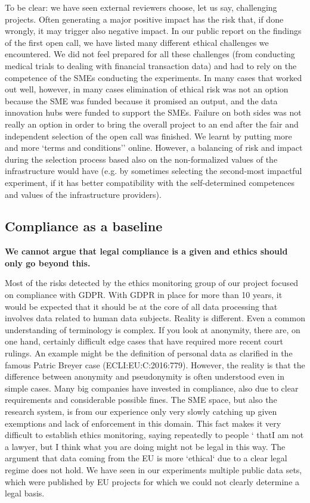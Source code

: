 To be clear: we have seen external reviewers choose, let us say,
challenging projects. Often generating a major positive impact has the
risk that, if done wrongly, it may trigger also negative impact. In our
public report on the findings of the first open call, we have listed
many different ethical challenges we encountered. We did not feel
prepared for all these challenges (from conducting medical trials to
dealing with financial transaction data) and had to rely on the
competence of the SMEs conducting the experiments. In many cases that
worked out well, however, in many cases elimination of ethical risk was
not an option because the SME was funded because it promised an output,
and the data innovation hubs were funded to support the SMEs. Failure on
both sides was not really an option in order to bring the overall
project to an end after the fair and independent selection of the open
call was finished. We learnt by putting more and more `terms and
conditions'' online. However, a balancing of risk and impact during the
selection process based also on the non-formalized values of the
infrastructure would have (e.g. by sometimes selecting the second-most
impactful experiment, if it has better compatibility with the
self-determined competences and values of the infrastructure providers).

\subsection{Compliance as a baseline}\label{compliance-as-a-baseline}

\textbf{We cannot argue that legal compliance is a given and ethics
should only go beyond this.}

Most of the risks detected by the ethics monitoring group of our project
focused on compliance with GDPR. With GDPR in place for more than 10
years, it would be expected that it should be at the core of all data
processing that involves data related to human data subjects. Reality is different. Even a common understanding of terminology is
complex. If you look at anonymity, there are, on one hand, certainly
difficult edge cases that have required more recent court rulings. An
example might be the definition of personal data as clarified in the
famous Patric Breyer case (ECLI:EU:C:2016:779). However, the reality is
that the difference between anonymity and pseudonymity is often
understood even in simple cases. Many big companies have invested in
compliance, also due to clear requirements and considerable possible
fines. The SME space, but also the research system, is from our
experience only very slowly catching up given exemptions and lack of
enforcement in this domain. This fact makes it very difficult to establish
ethics monitoring, saying repeatedly to people ` thatI am not a lawyer, but I
think what you are doing might not be legal in this way. The argument that
data coming from the EU is more `ethical` due to a clear legal regime
does not hold. We have seen in our experiments multiple public data sets,
which were published by EU projects for which we could not clearly
determine a legal basis.

